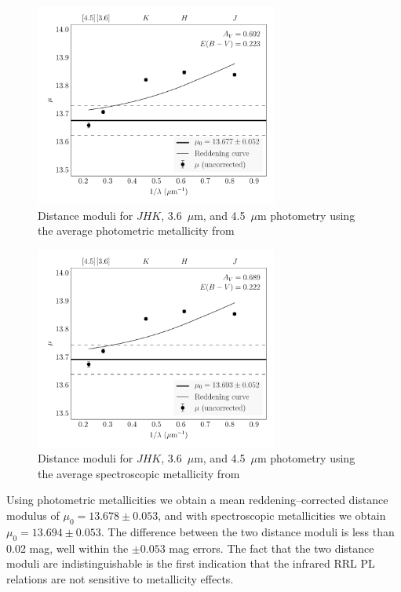 \documentclass[a4paper,fleqn,usenatbib]{mnras}
\begin{document}
\begin{figure}
\begin{center}
\includegraphics[width=80mm]{final_plots/multiwavelength_distance_samestars_phot.pdf}
\caption{Distance moduli for $J\!H\!K$, 3.6~$\mu$m, and 4.5~$\mu$m photometry using the average photometric metallicity from \citet{2000AJ....119.1824R}}
\label{fig:omegaCen_dist_phot}
\end{center}
\end{figure}

\begin{figure}
\begin{center}
\includegraphics[width=80mm]{final_plots/multiwavelength_distance_samestars_spect.pdf}
\caption{Distance moduli for $J\!H\!K$, 3.6~$\mu$m, and 4.5~$\mu$m photometry using the average spectroscopic metallicity from \citet{2006ApJ...640L..43S}}
\label{fig:omegaCen_dist_spect}
\end{center}
\end{figure}

Using photometric metallicities we obtain a mean reddening--corrected distance modulus of $\mu_0 = 13.678 \pm 0.053$, and with spectroscopic metallicities we obtain $\mu_0 = 13.694 \pm 0.053$.
The difference between the two distance moduli is less than 0.02 mag, well within the $\pm 0.053$ mag errors. The fact that the two distance moduli are indistinguishable is the first indication that the infrared RRL PL relations are not sensitive to metallicity effects.
\end{document}

